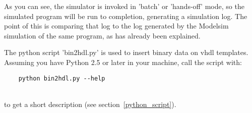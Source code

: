     As you can see, the simulator is invoked in 'batch' or 'hands-off' mode, so
    the simulated program will be run to completion, generating a simulation 
    log. The point of this is comparing that log to the log generated by the 
    Modelsim simulation of the same program, as has already been explained.

    The python script 'bin2hdl.py' is used to insert binary data on vhdl 
    templates. 
    Assuming you have Python 2.5 or later in your machine, call the script with:

    \begin{verbatim}
    python bin2hdl.py --help
    \end{verbatim}\\

    to get a short description (see section~\ref{python_script}).
    
